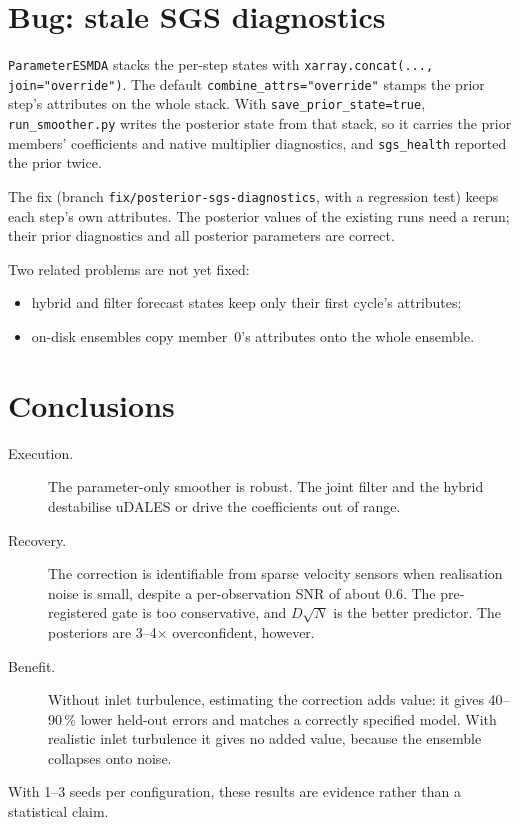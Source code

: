 \documentclass[11pt,a4paper]{article}
\newcommand{\code}[1]{\texttt{#1}}
\newcommand{\good}[1]{\textcolor{green!45!black}{#1}}
\newcommand{\bad}[1]{\textcolor{red!65!black}{#1}}
\begin{document}
\section{Bug: stale SGS diagnostics}
\label{sec:bug}

\code{ParameterESMDA} stacks the per-step states with
\code{xarray.concat(..., join="override")}. The default
\code{combine\_attrs="override"} stamps the prior step's attributes on the
whole stack. With \code{save\_prior\_state=true}, \code{run\_smoother.py}
writes the posterior state from that stack, so it carries the prior members'
coefficients and native multiplier diagnostics, and \code{sgs\_health}
reported the prior twice.

The fix (branch \code{fix/posterior-sgs-diagnostics}, with a regression
test) keeps each step's own attributes. The posterior values of the existing
runs need a rerun; their prior diagnostics and all posterior parameters are
correct.

Two related problems are not yet fixed:
\begin{itemize}
\item hybrid and filter forecast states keep only their first cycle's
  attributes;
\item on-disk ensembles copy member~0's attributes onto the whole ensemble.
\end{itemize}

\section{Conclusions}

\begin{description}
\item[Execution.] The parameter-only smoother is robust. The joint filter
  and the hybrid destabilise uDALES or drive the coefficients out of range.
\item[Recovery.] The correction is identifiable from sparse velocity sensors
  when realisation noise is small, despite a per-observation SNR of about
  0.6. The pre-registered gate is too conservative, and $D\sqrt N$ is the
  better predictor. The posteriors are 3--4$\times$ overconfident, however.
\item[Benefit.] Without inlet turbulence, estimating the correction
  \good{adds value}: it gives 40--90\,\% lower held-out errors and matches a
  correctly specified model. With realistic inlet turbulence it gives
  \bad{no added value}, because the ensemble collapses onto noise.
\end{description}
With 1--3 seeds per configuration, these results are evidence rather than a
statistical claim.
\end{document}
